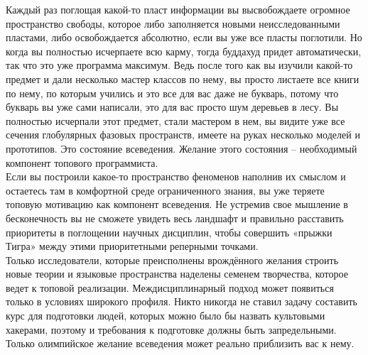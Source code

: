 Каждый раз поглощая какой-то пласт информации вы высвобождаете огромное пространство свободы, которое либо заполняется новыми неисследованными пластами, либо освобождается абсолютно, если вы уже все пласты поглотили. Но когда вы полностью исчерпаете всю карму, тогда буддахуд придет автоматически, так что это уже программа максимум. Ведь после того как вы изучили какой-то предмет и дали несколько мастер классов по нему, вы просто листаете все книги по нему, по которым учились и это все для вас даже не букварь, потому что букварь вы уже сами написали, это для вас просто шум деревьев в лесу. Вы полностью исчерпали этот предмет, стали мастером в нем, вы видите уже все сечения глобулярных фазовых пространств, имеете на руках несколько моделей и прототипов. Это состояние всеведения. Желание этого состояния – необходимый компонент топового программиста.
\\
Если вы построили какое-то пространство феноменов наполнив их смыслом и остаетесь там в комфортной среде ограниченного знания, вы уже теряете топовую мотивацию как компонент всеведения. Не устремив свое мышление в бесконечность вы не сможете увидеть весь ландшафт и правильно расставить приоритеты в поглощении научных дисциплин, чтобы совершить «прыжки Тигра» между этими приоритетными реперными точками.
\\
Только исследователи, которые преисполнены врождённого желания строить новые теории и языковые пространства наделены семенем творчества, которое ведет к топовой реализации. Междисциплинарный подход может появиться только в условиях широкого профиля. Никто никогда не ставил задачу составить курс для подготовки людей, которых можно было бы назвать культовыми хакерами, поэтому и требования к подготовке должны быть запредельными. Только олимпийское желание всеведения может реально приблизить вас к нему.

\normalsize
